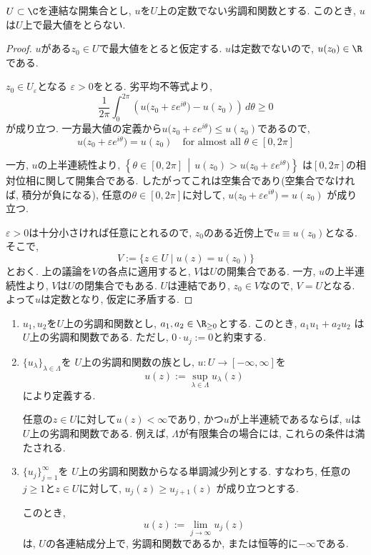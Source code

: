 \begin{tcolorbox}[mybox]
\begin{thm}
$U \subset \C$を連結な開集合とし,
$u$を$U$上の定数でない劣調和関数とする.
このとき, $u$は$U$上で最大値をとらない.
\end{thm}
\end{tcolorbox}

\begin{proof}
$u$がある$z_0 \in U$で最大値をとると仮定する.
$u$は定数でないので, $u(z_0) \in \R$である.

$z_0 \in U_\varepsilon$となる
$\varepsilon > 0$をとる.
劣平均不等式より,
\[
\frac{1}{2\pi}
\int_0^{2\pi}
\left(
u\bigl(z_0+\varepsilon e^{i\theta}\bigr)-u(z_0)
\right)\,d\theta
\geq 0
\]
が成り立つ.
一方最大値の定義から$u\bigl(z_0+\varepsilon e^{i\theta}\bigr) \le u(z_0)$であるので, 
$$
u\bigl(z_0+\varepsilon e^{i\theta}\bigr) 
=u(z_0)
\quad \text{for almost all $\theta \in [0, 2\pi]$}
$$

一方, $u$の上半連続性より,
\(
\left\{
\theta \in [0,2\pi]
\,\middle|\,
u(z_0)>u\bigl(z_0+\varepsilon e^{i\theta}\bigr)
\right\}
\)
は$[0,2\pi]$の相対位相に関して開集合である.
したがってこれは空集合であり(空集合でなければ, 積分が負になる), 
任意の$\theta \in [0,2\pi]$に対して,
\(
u\bigl(z_0+\varepsilon e^{i\theta}\bigr)=u(z_0)
\)
が成り立つ.

$\varepsilon > 0$は十分小さければ任意にとれるので,
$z_0$のある近傍上で$u \equiv u(z_0)$となる.
そこで,
\[
V:=\{z \in U \mid u(z)=u(z_0)\}
\]
とおく.
上の議論を$V$の各点に適用すると,
$V$は$U$の開集合である.
一方, $u$の上半連続性より,
$V$は$U$の閉集合でもある.
$U$は連結であり, $z_0 \in V$なので, $V=U$となる.
よって$u$は定数となり, 仮定に矛盾する.
\end{proof}

\begin{tcolorbox}[mybox]
\begin{lem}
\begin{enumerate}[label=(\roman*)]
\item
$u_1,u_2$を$U$上の劣調和関数とし,
$a_1,a_2 \in \R_{\geq 0}$とする.
このとき,
\(
a_1u_1+a_2u_2
\)
は$U$上の劣調和関数である.
ただし, $0 \cdot u_j:=0$と約束する.

\item
$\{u_\lambda\}_{\lambda \in \Lambda}$を
$U$上の劣調和関数の族とし,
$u \colon U \to [-\infty,\infty]$を
\[
u(z):=\sup_{\lambda \in \Lambda}u_\lambda(z)
\]
により定義する.

任意の$z \in U$に対して$u(z)<\infty$であり,
かつ$u$が上半連続であるならば,
$u$は$U$上の劣調和関数である.
例えば, $\Lambda$が有限集合の場合には,
これらの条件は満たされる.

\item
$\{u_j\}_{j=1}^{\infty}$を
$U$上の劣調和関数からなる単調減少列とする.
すなわち, 任意の$j \geq 1$と$z \in U$に対して,
\(
u_j(z) \geq u_{j+1}(z)
\)
が成り立つとする.

このとき,
\[
u(z):=\lim_{j \to \infty}u_j(z)
\]
は, $U$の各連結成分上で,
劣調和関数であるか, または恒等的に$-\infty$である.

\end{enumerate}
\end{lem}
\end{tcolorbox}

